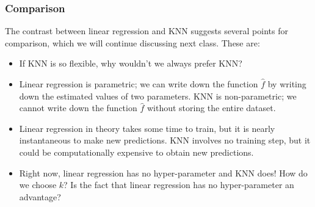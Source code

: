 \documentclass[titlepage,10pt]{scrartcl}
\begin{document}
\subsubsection{Comparison}

The contrast between linear regression and KNN suggests several points for comparison, which we will continue discussing next class. These are:
\begin{itemize}
\item If KNN is so flexible, why wouldn't we always prefer KNN? 
\item Linear regression is parametric; we can write down the function $\hat{f}$ by writing down the estimated values of two parameters. KNN is non-parametric; we cannot write down the function $\hat{f}$ without storing the entire dataset. 
\item Linear regression in theory takes some time to train, but it is nearly instantaneous to make new predictions. KNN involves no training step, but it could be computationally expensive to obtain new predictions. 
\item Right now, linear regression has no hyper-parameter and KNN does! How do we choose $k$? Is the fact that linear regression has no hyper-parameter an advantage? 
\end{itemize}
\end{document}
